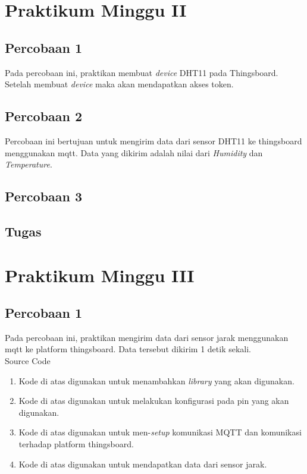 \documentclass{class}
\begin{document}
  \section{Praktikum Minggu II}
  \subsection{Percobaan 1}
    Pada percobaan ini, praktikan membuat \emph{device} DHT11 pada Thingsboard.
    Setelah membuat \emph{device} maka akan mendapatkan akses token.
  \subsection{Percobaan 2}
    Percobaan ini bertujuan untuk mengirim data dari sensor DHT11 ke thingsboard menggunakan mqtt.
    Data yang dikirim adalah nilai dari \emph{Humidity} dan \emph{Temperature}.

  \subsection{Percobaan 3}
  \subsection{Tugas}
\section{Praktikum Minggu III}
    \subsection{Percobaan 1}
    Pada percobaan ini, praktikan mengirim data dari sensor jarak menggunakan mqtt ke platform thingsboard.
    Data tersebut dikirim 1 detik sekali. \\
    Source Code
    \begin{enumerate}
      \item 
      Kode di atas digunakan untuk menambahkan \emph{library} yang akan digunakan. \\
      \item 
      Kode di atas digunakan untuk melakukan konfigurasi pada pin yang akan digunakan. \\
      \item 
      Kode di atas digunakan untuk men-\emph{setup} komunikasi MQTT dan komunikasi terhadap platform thingsboard. \\
      \item 
      Kode di atas digunakan untuk mendapatkan data dari sensor jarak.
    \end{enumerate}
\end{document}
